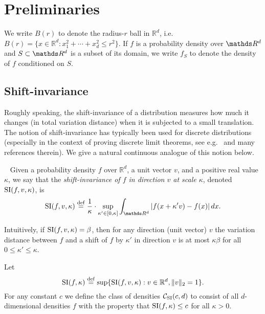 
\section{Preliminaries} \label{sec:prelims}

We write $B(r)$ to denote the radius-$r$ ball in $\mathbb{R}^d$, i.e. $B(r) = \{x \in \mathbb{R}^d: x_1^2 + \cdots + x_d^2 \leq r^2\}$.
If $f$ is a probability density over $\R^d$ and $S \subset \R^d$ is a subset of its domain, we write $f_S$ to denote the density of $f$ conditioned on $S$.

\subsection{Shift-invariance}
Roughly speaking, the shift-invariance of a distribution measures how
much it changes (in total variation distance) when it is subjected to
a small translation.  The notion of shift-invariance has typically
been used for discrete distributions (especially in the context of
proving discrete limit theorems, see e.g.~\citep{CGS11} and many
references therein).  We give a natural continuous analogue of this
notion below.

\begin{definition}~\label{def:shift-invariance} 
Given a probability density $f$ over $\mathbb{R}^d$, a unit vector $v$, and a positive real value $\kappa$, we say that the \emph{shift-invariance of $f$ in direction $v$ at scale $\kappa$}, denoted ${\mathrm{SI}}(f,v,\kappa)$, is
\begin{equation} \label{eq:yyy}
\si(f,v,\kappa) \eqdef 
{\frac 1 \kappa} \cdot \sup_{\kappa' \in [0,\kappa]} \int_{\R^d} 
   \left|f(x+ \kappa' v) - f(x)\right| dx.
\end{equation}
\end{definition}

Intuitively, if ${\mathrm{SI}}(f,v,\kappa)=\beta$, then for any direction (unit vector) $v$ 
the variation distance between $f$ and a shift of $f$ by $\kappa'$ in direction $v$ is at most $\kappa \beta$ for all $0 \leq \kappa' \leq \kappa$.


Let
\[
{\mathrm{SI}}(f,\kappa) \stackrel{\rm def}{=} \sup \{ {\mathrm{SI}}(f,v,\kappa) : v \in \mathbb{R}^d, \Vert v \Vert_2 =1\}.
\]
For any 
constant $c$
we define the class of densities ${\mathcal C}_{\mathrm{SI}}(c, d)$  to consist of all $d$-dimensional densities $f$ with the property that ${\mathrm{SI}}(f,\kappa) \le c$ for all $\kappa > 0.$  

